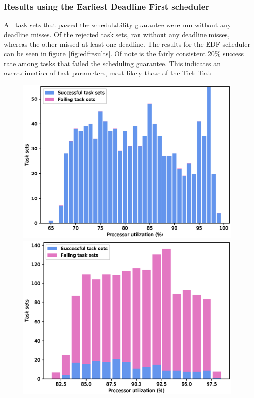 \newpage
\subsubsection{Results using the Earliest Deadline First scheduler}
All \totalsuccess{} task sets that passed the schedulability guarantee were run without any deadline misses. Of the \totalfailure{} rejected task sets, \edffailurepassed{} ran without any deadline misses, whereas the other \edffailurefailed{} missed at least one deadline. The results for the EDF scheduler can be seen in figure~\ref{fig:edfresults}. Of note is the fairly consistent 20\% success rate among tasks that failed the scheduling guarantee. This indicates an overestimation of task parameters, most likely those of the \ucos Tick Task.

\begin{figure}[htpb]
    \centering
    \hspace*{-1.6cm}
    \begin{minipage}{0.62\textwidth}
        \includegraphics[width=\textwidth]{figures/edf_guarantee_pass_percentage.eps}
    \end{minipage}%
    \begin{minipage}{0.62\textwidth}
        \includegraphics[width=\textwidth]{figures/edf_guarantee_fail_percentage.eps}

\end{minipage}
\end{figure}
